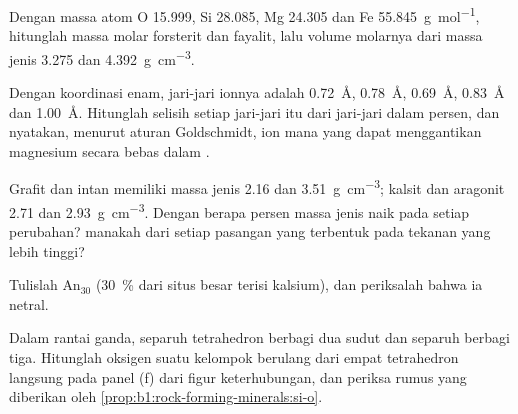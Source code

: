 \begin{exercise}[$\star$]\label{exo:b1:rock-forming-minerals:2}
Dengan massa atom O \num{15.999}, Si \num{28.085}, Mg \num{24.305} dan Fe \qty{55.845}{g.mol^{-1}}, hitunglah massa molar forsterit dan fayalit, lalu volume molarnya dari massa jenis \num{3.275} dan \qty{4.392}{g.cm^{-3}}.
\end{exercise}

\begin{exercise}[$\star$]\label{exo:b1:rock-forming-minerals:3}
Dengan koordinasi enam, jari-jari ionnya adalah  \qty{0.72}{\angstrom},  \qty{0.78}{\angstrom},  \qty{0.69}{\angstrom},  \qty{0.83}{\angstrom} dan  \qty{1.00}{\angstrom}. Hitunglah selisih setiap jari-jari itu dari jari-jari  dalam persen, dan nyatakan, menurut aturan Goldschmidt, ion mana yang dapat menggantikan magnesium secara bebas dalam .
\end{exercise}

\begin{exercise}[$\star$]\label{exo:b1:rock-forming-minerals:4}
Grafit dan intan memiliki massa jenis \num{2.16} dan \qty{3.51}{g.cm^{-3}}; kalsit dan aragonit \num{2.71} dan \qty{2.93}{g.cm^{-3}}. Dengan berapa persen massa jenis naik pada setiap perubahan?  manakah dari setiap pasangan yang terbentuk pada tekanan yang lebih tinggi?
\end{exercise}

\begin{exercise}[$\star\star$]\label{exo:b1:rock-forming-minerals:5}
Tulislah   $\text{An}_{30}$ (\qty{30}{\percent}
dari situs besar terisi kalsium), dan periksalah bahwa ia netral.
\end{exercise}

\begin{exercise}[$\star\star$]\label{exo:b1:rock-forming-minerals:6}
Dalam rantai ganda, separuh tetrahedron berbagi dua sudut dan separuh berbagi tiga. Hitunglah oksigen suatu kelompok berulang dari empat tetrahedron langsung pada panel (f) dari figur keterhubungan, dan periksa rumus  yang diberikan oleh \cref{prop:b1:rock-forming-minerals:si-o}.
\end{exercise}

